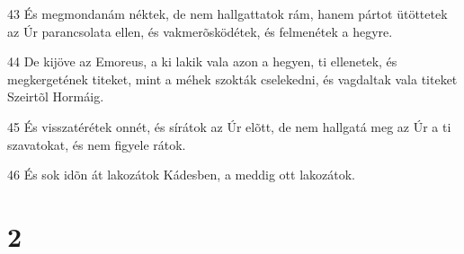 \par 43 És megmondanám néktek, de nem hallgattatok rám, hanem pártot ütöttetek az Úr parancsolata ellen, és vakmerõsködétek, és felmenétek a hegyre.
\par 44 De kijöve az Emoreus, a ki lakik vala azon a hegyen, ti ellenetek, és megkergetének titeket, mint a méhek szokták cselekedni, és vagdaltak vala titeket Szeirtõl Hormáig.
\par 45 És visszatérétek onnét, és sírátok az Úr elõtt, de nem hallgatá meg az Úr a ti szavatokat, és nem figyele rátok.
\par 46 És sok idõn át lakozátok Kádesben, a meddig ott lakozátok.

\chapter{2}

